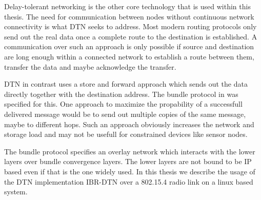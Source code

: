 Delay-tolerant networking is the other core technology that is used within this
thesis. The need for communication between nodes without continuous network
connectivity is what DTN seeks to address. Most modern routing protocols only
send out the real data once a complete route to the destination is established.
A communication over such an approach is only possible if source and destination
are long enough within a connected network to establish a route between them,
transfer the data and maybe acknowledge the transfer.

DTN in contrast uses a store and forward approach which sends out the data
directly together with the destination address. The bundle protocol in
\cite{RFC5050} was specified for this. One approach to maximize the propability
of a successfull delivered message would be to send out multiple copies of the
same message, maybe to different hops. Such an approach obviously increases the
network and storage load and may not be usefull for constrained devices like
sensor nodes.

The bundle protocol specifies an overlay network which interacts with the lower
layers over bundle convergence layers. The lower layers are not bound to be IP
based even if that is the one widely used. In this thesis we describe the usage
of the DTN implementation IBR-DTN over a 802.15.4 radio link on a linux based
system.
